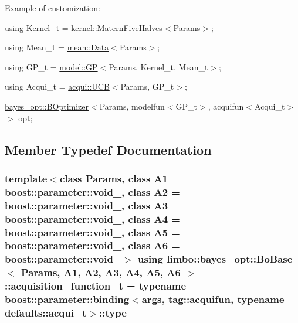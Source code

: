 Example of customization\+:
\begin{DoxyItemize}
\item {\ttfamily using Kernel\+\_\+t = \hyperlink{structlimbo_1_1kernel_1_1_matern_five_halves}{kernel\+::\+Matern\+Five\+Halves}$<$Params$>$;}
\item {\ttfamily using Mean\+\_\+t = \hyperlink{structlimbo_1_1mean_1_1_data}{mean\+::\+Data}$<$Params$>$;}
\item {\ttfamily using G\+P\+\_\+t = \hyperlink{classlimbo_1_1model_1_1_g_p}{model\+::\+G\+P}$<$Params, Kernel\+\_\+t, Mean\+\_\+t$>$;}
\item {\ttfamily using Acqui\+\_\+t = \hyperlink{classlimbo_1_1acqui_1_1_u_c_b}{acqui\+::\+U\+C\+B}$<$Params, G\+P\+\_\+t$>$;}
\item {\ttfamily \hyperlink{classlimbo_1_1bayes__opt_1_1_b_optimizer}{bayes\+\_\+opt\+::\+B\+Optimizer}$<$Params, modelfun$<$G\+P\+\_\+t$>$, acquifun$<$Acqui\+\_\+t$>$$>$ opt;} 
\end{DoxyItemize}

\subsection{Member Typedef Documentation}
\hypertarget{classlimbo_1_1bayes__opt_1_1_bo_base_a5abe502b49e1ee70d5e00f27f95f5dff}{}
\subsubsection[{acquisition\+\_\+function\+\_\+t}]{\setlength{\rightskip}{0pt plus 5cm}template$<$class Params, class A1 = boost\+::parameter\+::void\+\_\+, class A2 = boost\+::parameter\+::void\+\_\+, class A3 = boost\+::parameter\+::void\+\_\+, class A4 = boost\+::parameter\+::void\+\_\+, class A5 = boost\+::parameter\+::void\+\_\+, class A6 = boost\+::parameter\+::void\+\_\+$>$ using {\bf limbo\+::bayes\+\_\+opt\+::\+Bo\+Base}$<$ Params, A1, A2, A3, A4, A5, A6 $>$\+::{\bf acquisition\+\_\+function\+\_\+t} =  typename boost\+::parameter\+::binding$<${\bf args}, tag\+::acquifun, typename {\bf defaults\+::acqui\+\_\+t}$>$\+::type}\label{classlimbo_1_1bayes__opt_1_1_bo_base_a5abe502b49e1ee70d5e00f27f95f5dff}
\hypertarget{classlimbo_1_1bayes__opt_1_1_bo_base_a800d7d9dec5ac0c12b93150f12db9be3}{}
